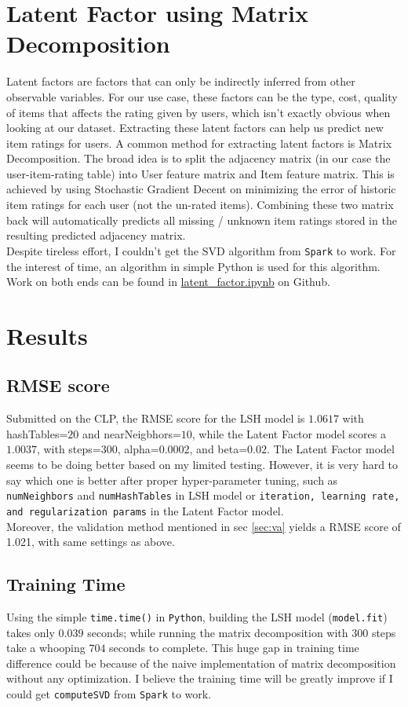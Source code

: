 \documentclass{scrartcl}
\begin{document}
\section{Latent Factor using Matrix Decomposition}
Latent factors are factors that can only be indirectly inferred from other observable variables. For our use case, these factors can be the type, cost, quality of items that affects the rating given by users, which isn't exactly obvious when looking at our dataset. Extracting these latent factors can help us predict new item ratings for users. A common method for extracting latent factors is Matrix Decomposition. The broad idea is to split the adjacency matrix (in our case the user-item-rating table) into User feature matrix and Item feature matrix. This is achieved by using Stochastic Gradient Decent on minimizing the error of historic item ratings for each user (not the un-rated items). Combining these two matrix back will automatically predicts all missing / unknown item ratings stored in the resulting predicted adjacency matrix. \\
Despite tireless effort, I couldn't get the SVD algorithm from \texttt{Spark} to work. For the interest of time, an algorithm in simple Python is used for this algorithm. Work on both ends can be found in \href{https://github.com/ckwojai/cmpe297-final/blob/main/latent_factor.ipynb}{latent\_factor.ipynb} on Github.
\section{Results}
\subsection{RMSE score}
Submitted on the CLP, the RMSE score for the LSH model is $1.0617$ with hashTables=$20$ and nearNeigbhors=$10$, while the Latent Factor model scores a $1.0037$, with steps=$300$, alpha=$0.0002$, and beta=$0.02$. The Latent Factor model seems to be doing better based on my limited testing. However, it is very hard to say which one is better after proper hyper-parameter tuning, such as \texttt{numNeighbors} and \texttt{numHashTables} in LSH model or \texttt{iteration, learning rate, and regularization params} in the Latent Factor model. \\
Moreover, the validation method mentioned in sec \ref{sec:va} yields a RMSE score of 1.021, with same settings as above.
\subsection{Training Time}
Using the simple \texttt{time.time()} in \texttt{Python}, building the LSH model (\texttt{model.fit}) takes only $0.039$ seconds; while running the matrix decomposition with 300 steps take a whooping $704$ seconds to complete. This huge gap in training time difference could be because of the naive implementation of matrix decomposition without any optimization. I believe the training time will be greatly improve if I could get \texttt{computeSVD} from \texttt{Spark} to work.
\end{document}
